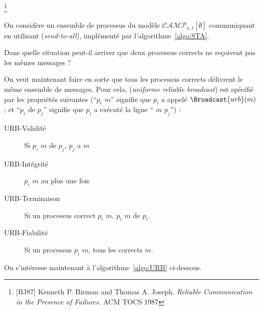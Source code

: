 
\begingroup

\begin{exercice}
  \footnote{[BJ87] Kenneth P. Birman and Thomas A. Joseph. \emph{Reliable Communication in the Presence of Failures.} ACM TOCS 1987}
  \label{crash}
  
  On considère un ensemble de processus du modèle $\mathcal{CAMP}_{n, t}[\emptyset]$
  communiquant en utilisant  (\emph{send-to-all}), implémenté par l'algorithme~\ref{algo:STA}.

  \begin{algorithm}
    
    \caption{Send-to-all broadcast (code for $p_i$)}
    \label{algo:STA}
  \end{algorithm}
  
  \begin{questions}
  \item Dans quelle situation peut-il arriver que deux processus corrects ne reçoivent pas les mêmes messages ?  
  \end{questions}

  On veut maintenant faire en sorte que tous les processus corrects délivrent le même ensemble de messages.
  Pour cela,  (\emph{uniforme reliable broadcast}) est spécifié par les propriétés suivantes
  (``$p_i$  $m$'' signifie que $p_i$ a appelé $\Broadcast{urb}(m)$ ; 
  et ``$p_i$  de $p_j$'' signifie que $p_i$ a exécuté la ligne `` $m$ \From $p_j$'') :

  \begin{description}
  \item[URB-Validité] Si $p_i$  $m$ de $p_j$, $p_j$ a  $m$
  \item[URB-Intégrité] $p_i$  $m$ au plus une fois
  \item[URB-Terminaison] Si un processus correct $p_i$  $m$, $p_i$  $m$ de $p_i$.
  \item[URB-Fiabilité] Si un processus $p_i$  $m$, tous les corrects  $m$.
  \end{description}
  On s'intéresse maintenant à l'algorithme~\ref{algo:URB} ci-dessous.
  

\end{exercice}
